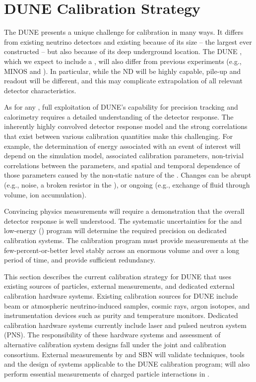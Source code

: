 \section{DUNE Calibration Strategy}
\label{sec:phys-calib-strat}


The DUNE  presents a unique challenge for calibration in many ways. It differs from existing  neutrino detectors and existing  because of its size -- the largest  ever constructed -- but also because of its deep underground location. 
The DUNE , which we expect to include a , will also differ from previous experiments (e.g., MINOS and \nova). In particular, while the ND will be highly capable, pile-up and readout will be different, and this may complicate extrapolation of all relevant detector characteristics.

As for any \lartpc, full exploitation of DUNE's capability for precision tracking and calorimetry requires a detailed understanding of the detector response. The inherently highly convolved detector response model and the strong correlations that exist between various calibration quantities make this challenging. 
For example, the determination of energy associated with an event of interest will depend on the simulation model, associated calibration parameters, non-trivial correlations between the parameters, and spatial and temporal dependence of those parameters caused by the non-static nature of the . 
Changes can be abrupt (e.g., noise, a broken resistor in the ), or ongoing (e.g., exchange of fluid through volume, ion accumulation).

Convincing physics measurements will require a demonstration that the overall detector response is well understood. The systematic uncertainties for the  and low-energy () program will determine the required precision on dedicated calibration systems.
The calibration program must provide measurements at the few-percent-or-better level stably across an enormous volume and over a long period of time, and provide sufficient redundancy.

This section describes the current calibration strategy for DUNE that uses existing sources of particles, external measurements, and dedicated external calibration hardware systems. Existing calibration sources for DUNE include beam or atmospheric neutrino-induced samples, cosmic rays, argon isotopes, and instrumentation devices such as \lar purity and temperature monitors. Dedicated calibration hardware systems currently include laser and pulsed neutron system (PNS).
The responsibility of these hardware systems and assessment of alternative calibration system designs fall under the joint  and  calibration consortium. External measurements by  and SBN will validate techniques, tools and the design of systems applicable to the DUNE calibration program;   will also perform essential measurements of charged particle interactions in .


